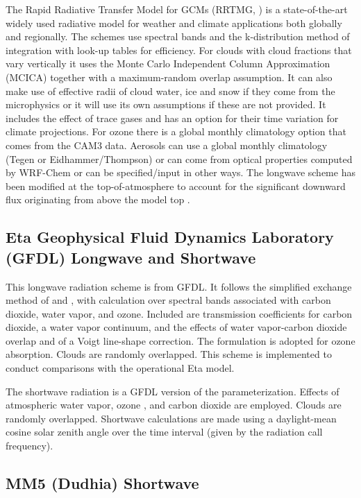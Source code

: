 The Rapid Radiative Transfer Model for GCMs (RRTMG, \citet{iacono08}) is a state-of-the-art
widely used radiative model for weather and climate applications both globally
and regionally. The schemes use spectral bands and the k-distribution method of
integration with look-up tables for efficiency. For clouds with cloud fractions that vary vertically it uses the 
Monte Carlo Independent Column Approximation (MCICA) together with a 
maximum-random overlap assumption. It can also make use of effective radii
of cloud water, ice and snow if they come from the microphysics or it will use its
own assumptions if these are not provided. It includes the effect
of trace gases and has an option for their time variation for climate projections.
For ozone there is a global monthly climatology option that comes from the CAM3 data.
Aerosols can use a global monthly climatology (Tegen or Eidhammer/Thompson) or can come from
optical properties computed by WRF-Chem or can be specified/input in other ways. The longwave scheme has been
modified at the top-of-atmosphere to account for the significant downward flux originating from 
above the model top \citep{cavallo11}.
 
\subsection {Eta Geophysical Fluid Dynamics Laboratory (GFDL) Longwave and Shortwave}

This longwave radiation scheme is from GFDL. It follows the simplified exchange 
method of \citet{fels75} and \citet{schwarzkopf91}, 
with calculation over spectral bands associated with carbon dioxide, water vapor, 
and ozone. Included are \citet{schwarzkopf85} transmission coefficients for carbon 
dioxide, a \citet{roberts76} water vapor continuum, and the effects of 
water vapor-carbon dioxide overlap and of a Voigt line-shape correction.
The \citet{rodgers68} formulation is adopted for ozone absorption. 
Clouds are randomly overlapped. 
This scheme is implemented to conduct comparisons with the operational Eta model.

The shortwave radiation is a GFDL version of the \citet{lacis74}
parameterization. Effects of atmospheric water vapor, ozone 
\citep[both from][]{lacis74}, and carbon dioxide \citep{sasamori72}
are employed. Clouds are randomly overlapped. Shortwave calculations are made 
using a daylight-mean cosine solar zenith angle over the time interval 
(given by the radiation call frequency). 

\subsection {MM5 (Dudhia) Shortwave}


